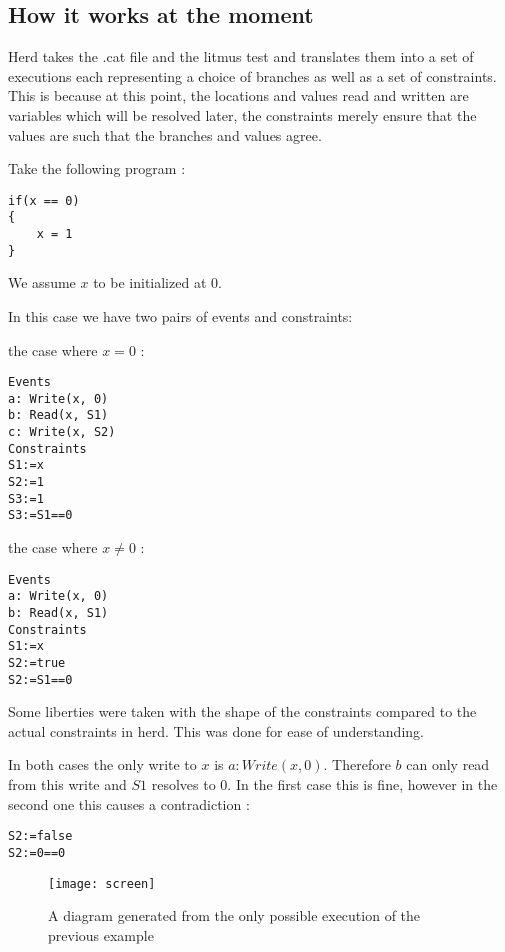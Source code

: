 \documentclass[a4,11pt,dvipsnames]{article}
\begin{document}
\subsection{How it works at the moment}

Herd takes the .cat file and the litmus test and translates them into a set of executions each representing a choice of branches as well as a set of constraints. This is because at this point, the locations and values read and written are variables which will be resolved later, the constraints merely ensure that the values are such that the branches and values agree.

Take the following program :

\begin{lstlisting}
if(x == 0)
{
	x = 1
}
\end{lstlisting}
{\footnotesize{We assume $x$ to be initialized at 0.}}

In this case we have two pairs of events and constraints:
\begin{itemize}
\item the case where $x = 0$ :\begin{lstlisting}
Events
a: Write(x, 0)
b: Read(x, S1)
c: Write(x, S2)
Constraints
S1:=x
S2:=1
S3:=1
S3:=S1==0
\end{lstlisting}

\begin{minipage}{\textwidth}
\item the case where $x \neq 0$ : \begin{lstlisting}
Events
a: Write(x, 0)
b: Read(x, S1)
Constraints
S1:=x
S2:=true
S2:=S1==0
\end{lstlisting}
\end{minipage}
\end{itemize}
{\footnotesize{Some liberties were taken with the shape of the constraints compared to the actual constraints in herd. This was done for ease of understanding.}}

In both cases the only write to $x$ is $a: Write(x, 0)$. Therefore $b$ can only read from this write and $S1$ resolves to 0. In the first case this is fine, however in the second one this causes a contradiction :
\begin{lstlisting}
S2:=false
S2:=0==0
\end{lstlisting}

\begin{wrapfigure}{r}{4.5cm}
\texttt{[image: screen]}
\caption{{\footnotesize{A diagram generated from the only possible execution of the previous example}}}
\end{wrapfigure}
\end{document}
